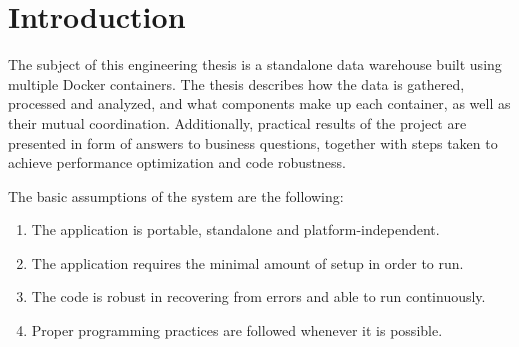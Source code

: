 \chapter{Introduction}
\label{ch:intro}
The subject of this engineering thesis is a standalone data warehouse built using multiple Docker containers. The thesis describes how the data is gathered, processed and analyzed, and what components make up each container, as well as their mutual coordination. Additionally, practical results of the project are presented in form of answers to business questions, together with steps taken to achieve performance optimization and code robustness. \par
The basic assumptions of the system are the following:
\begin{enumerate}
    \item The application is portable, standalone and platform-independent.
    \item The application requires the minimal amount of setup in order to run.
    \item The code is robust in recovering from errors and able to run continuously.
    \item Proper programming practices are followed whenever it is possible.
\end{enumerate}


